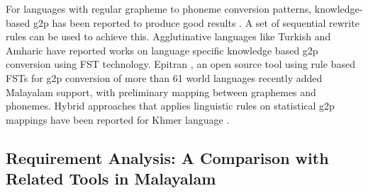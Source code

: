\documentclass{ieeeaccess}
\begin{document}
For languages with regular grapheme to phoneme conversion patterns, knowledge-based g2p has been reported to produce good results \cite{li-etal-2022-zero, sar2019applying}. A set of sequential rewrite rules can be used to achieve this. Agglutinative languages like Turkish \cite{oflazer2006architecture} and Amharic \cite{anberbir2011grapheme} have reported works on language specific knowledge based g2p conversion using FST technology. Epitran \cite{mortensen2018epitran}, an open source tool using rule based FSTs for g2p conversion of more than 61 world languages recently added Malayalam support, with preliminary mapping between graphemes and phonemes. Hybrid approaches that applies linguistic rules on statistical g2p mappings have been reported for Khmer language \cite{sar2019applying}. 



\subsection{Requirement Analysis: A Comparison with Related Tools in Malayalam}
\end{document}

